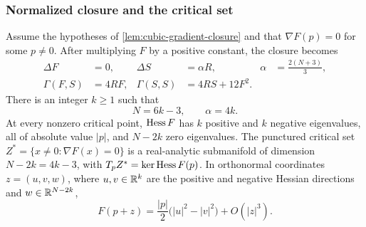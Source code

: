\subsubsection{Normalized closure and the critical set}

\begin{proposition}
\label{prop:cubic-singular-normalization}
Assume the hypotheses of \cref{lem:cubic-gradient-closure} and that
\(\nabla F(p)=0\) for some \(p\neq0\).  After multiplying \(F\)
by a positive constant, the closure becomes
\begin{equation}\label{eq:cubic-normalized-closure}
\begin{aligned}
 \Delta F&=0,& \Delta S&=\alpha R,&
 \alpha&=\frac{2(N+3)}3,\\
 \Gamma(F,S)&=4RF,&
 \Gamma(S,S)&=4RS+12F^2.
\end{aligned}
\end{equation}
There is an integer \(k\geq1\) such that
\begin{equation}\label{eq:cubic-dimension-quantization}
 N=6k-3,\qquad \alpha=4k.
\end{equation}
At every nonzero critical point, \(\operatorname{Hess} F\) has \(k\) positive
and \(k\) negative eigenvalues, all of absolute value \(|p|\), and
\(N-2k\) zero eigenvalues.
The punctured critical set \(Z^*=\{x\ne0:\nabla F(x)=0\}\) is a
real-analytic submanifold of dimension \(N-2k=4k-3\), with
\(T_pZ^*=\ker\operatorname{Hess} F(p)\).  In orthonormal coordinates
\(z=(u,v,w)\), where \(u,v\in\mathbb R^k\) are the positive and negative
Hessian directions and \(w\in\mathbb R^{N-2k}\),
\[
 F(p+z)=\frac{|p|}{2}\bigl(|u|^2-|v|^2\bigr)+O(|z|^3).
\]
\end{proposition}


